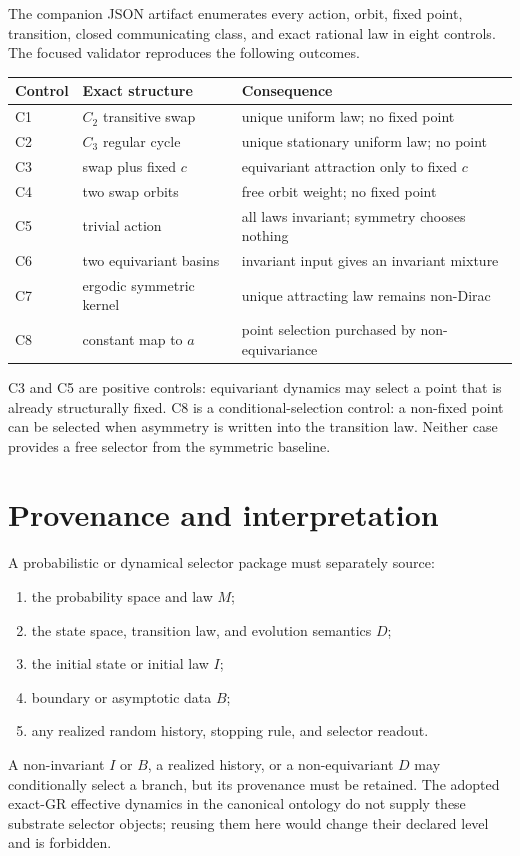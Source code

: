 \documentclass[11pt]{article}
\theoremstyle{definition}
\begin{document}
The companion JSON artifact enumerates every action, orbit, fixed point,
transition, closed communicating class, and exact rational law in eight
controls.  The focused validator reproduces the following outcomes.

\begin{center}
\small
\begin{tabular}{@{}lll@{}}
\toprule
Control & Exact structure & Consequence \\
\midrule
C1 & \(C_2\) transitive swap & unique uniform law; no fixed point \\
C2 & \(C_3\) regular cycle & unique stationary uniform law; no point \\
C3 & swap plus fixed \(c\) & equivariant attraction only to fixed \(c\) \\
C4 & two swap orbits & free orbit weight; no fixed point \\
C5 & trivial action & all laws invariant; symmetry chooses nothing \\
C6 & two equivariant basins & invariant input gives an invariant mixture \\
C7 & ergodic symmetric kernel & unique attracting law remains non-Dirac \\
C8 & constant map to \(a\) & point selection purchased by non-equivariance \\
\bottomrule
\end{tabular}
\end{center}

C3 and C5 are positive controls: equivariant dynamics may select a point that
is already structurally fixed.  C8 is a conditional-selection control: a
non-fixed point can be selected when asymmetry is written into the transition
law.  Neither case provides a free selector from the symmetric baseline.

\section{Provenance and interpretation}

A probabilistic or dynamical selector package must separately source:
\begin{enumerate}[label=(\roman*)]
 \item the probability space and law \(M\);
 \item the state space, transition law, and evolution semantics \(D\);
 \item the initial state or initial law \(I\);
 \item boundary or asymptotic data \(B\);
 \item any realized random history, stopping rule, and selector readout.
\end{enumerate}
A non-invariant \(I\) or \(B\), a realized history, or a non-equivariant
\(D\) may conditionally select a branch, but its provenance must be retained.
The adopted exact-GR effective dynamics in the canonical ontology do not
supply these substrate selector objects; reusing them here would change their
declared level and is forbidden.
\end{document}
